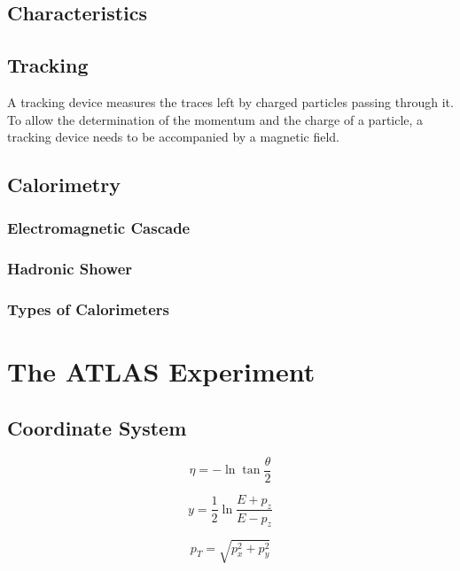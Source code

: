 \subsection{Characteristics}

\subsection{Tracking}
A tracking device measures the traces left by charged particles passing through it. To allow the determination of the momentum and the charge of a particle, a tracking device needs to be accompanied by a magnetic field. 

\subsection{Calorimetry}

\subsubsection{Electromagnetic Cascade}

\subsubsection{Hadronic Shower}

\subsubsection{Types of Calorimeters}


\section{The ATLAS Experiment}
\label{sed:cern:atlas}


\subsection{Coordinate System}

\begin{equation}
\label{eq:cern:eta}
\eta = - \ln \tan \frac{\theta}{2}
\end{equation}

\begin{equation}
\label{eq:cern:y}
y = \frac{1}{2} \ln \frac{E + p_z}{E - p_z}
\end{equation}

\begin{equation}
\label{eq:cern:pt}
p_T = \sqrt{p_x^2 + p_y^2}
\end{equation}

